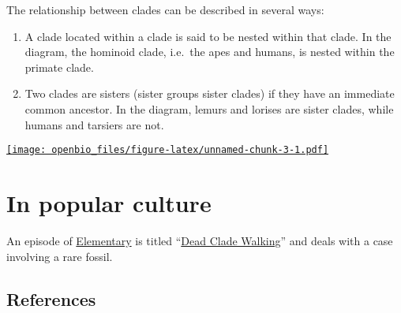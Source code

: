 \documentclass[
]{book}
\providecommand{\tightlist}{%
  \setlength{\itemsep}{0pt}\setlength{\parskip}{0pt}}
\begin{document}
The relationship between clades can be described in several ways:

\begin{enumerate}
\def\labelenumi{\arabic{enumi}.}
\tightlist
\item
  A clade located within a clade is said to be nested within that clade. In the diagram, the hominoid clade, i.e.~the apes and humans, is nested within the primate clade.
\item
  Two clades are sisters (sister groups sister clades) if they have an immediate common ancestor. In the diagram, lemurs and lorises are sister clades, while humans and tarsiers are not.
\end{enumerate}

\href{https://upload.wikimedia.org/wikipedia/commons/thumb/5/5e/Primate_cladogram.svg/556px-Primate_cladogram.svg.png}{\texttt{[image: openbio\_files/figure-latex/unnamed-chunk-3-1.pdf]}}

\hypertarget{in-popular-culture}{%
\section{In popular culture}\label{in-popular-culture}}

An episode of \href{https://en.wikipedia.org/wiki/Elementary_(TV_series)}{Elementary} is titled ``\href{https://en.wikipedia.org/wiki/List_of_Elementary_episodes\#ep38}{Dead Clade Walking}'' and deals with a case involving a rare fossil.

\hypertarget{references-1}{%
\subsection{References}\label{references-1}}
\end{document}
